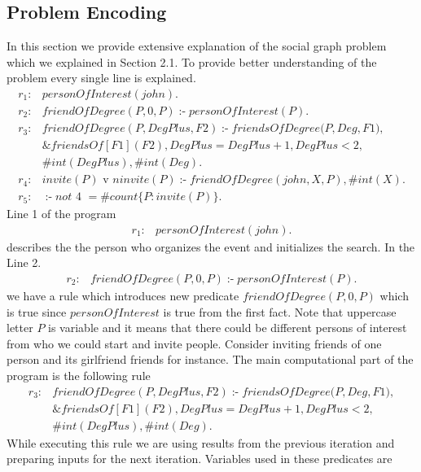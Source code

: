 \documentclass[14pt,a4paper, titlepage]{article}
\newcommand{\ext}[3]{\ensuremath{\&{#1}[#2](#3)}}
\DeclareMathOperator{\leftimpl}{:-}
\begin{document}
\subsection{Problem Encoding}
In this section we provide extensive explanation of the social graph problem which we explained in Section 2.1. 
To provide better understanding of the problem every single line is explained.
\begin{align*}
r_1\colon& \mathit{personOfInterest}(\mathit{john}).\\
r_2\colon& \mathit{friendOfDegree}(\mathit{P, 0, P}) \leftimpl \mathit{personOfInterest}(P).\\
r_{3}\colon& \mathit{friendOfDegree}(\mathit{P, DegPlus, F2}) \leftimpl \mathit{friendsOfDegree}(\mathit{P,Deg,F1)},\\
& \ext{friendsOf}{F1}{F2}, \mathit{DegPlus = DegPlus + 1}, \mathit{DegPlus < 2},\\
& \mathit{\#int(DegPlus)}, \mathit{\#int(Deg)}.\\
r_{4}\colon& \mathit{invite(P)} \text{ v } \mathit{ninvite(P) \leftimpl friendOfDegree(john,X,P), \#int(X).}\\
r_{5}\colon& \leftimpl \mathit{not} \text{ 4 } = \mathit{\#count} \{ P : \mathit{invite(P)} \}.
\end{align*}
Line 1 of the program 
\begin{align*}
r_1\colon& \mathit{personOfInterest}(\mathit{john}).
\end{align*} 
describes the the person who organizes the event and initializes the search. In the Line 2.
\begin{align*}
r_2\colon& \mathit{friendOfDegree}(\mathit{P, 0, P}) \leftimpl \mathit{personOfInterest}(P).
\end{align*} 
 we have a rule which introduces new predicate $\mathit{friendOfDegree(P,0,P)}$ which is true since $\mathit{personOfInterest}$ is true from the first fact. Note that uppercase letter $P$ is variable and it means that there could be different persons of interest from who we could start and invite people. Consider inviting friends of one person and its girlfriend friends for instance. The main computational part of the program is the following rule   
\begin{align*}
r_{3}\colon& \mathit{friendOfDegree}(\mathit{P, DegPlus, F2}) \leftimpl \mathit{friendsOfDegree}(\mathit{P,Deg,F1)},\\
& \ext{friendsOf}{F1}{F2}, \mathit{DegPlus = DegPlus + 1}, \mathit{DegPlus < 2},\\
& \mathit{\#int(DegPlus)}, \mathit{\#int(Deg)}.
\end{align*} 
While executing this rule we are using results from the previous iteration and preparing inputs for the next iteration. Variables used in these predicates are
\end{document}
